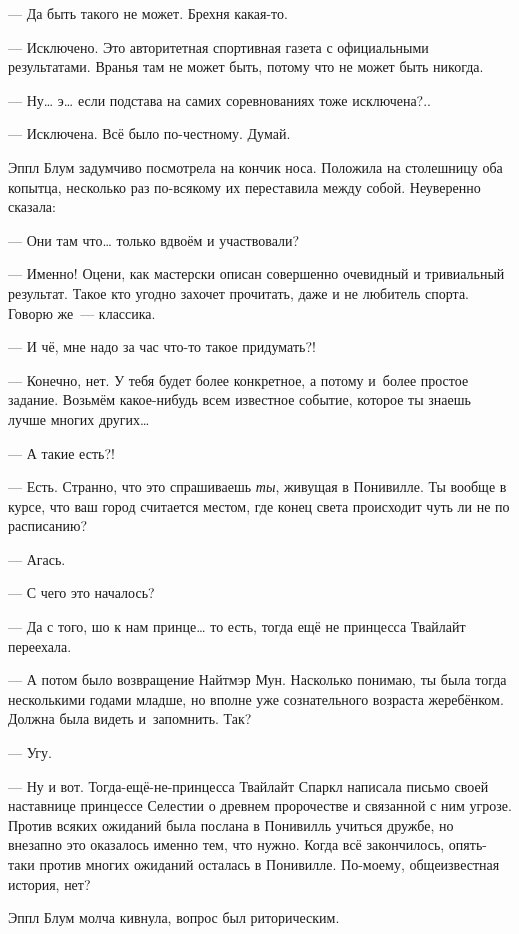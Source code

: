 \documentclass[fontsize=11pt,a5paper,titlepage=firstcover]{scrbook}
\begin{document}
--- Да быть такого не может. Брехня какая-то.

--- Исключено. Это авторитетная спортивная газета с официальными результатами. Вранья там не может быть, потому что не может быть никогда.

--- Ну{\ldots} э{\ldots} если подстава на самих соревнованиях тоже исключена?..

--- Исключена. Всё было по-честному. Думай.

Эппл Блум задумчиво посмотрела на кончик носа. Положила на столешницу оба копытца, несколько раз по-всякому их переставила между собой. Неуверенно сказала:

--- Они там что{\ldots} только вдвоём и участвовали?

--- Именно! Оцени, как мастерски описан совершенно очевидный и тривиальный результат. Такое кто угодно захочет прочитать, даже и не любитель спорта. Говорю же~--- классика.

--- И чё, мне надо за час что-то такое придумать?!

--- Конечно, нет. У тебя будет более конкретное, а потому и~более простое задание. Возьмём какое-нибудь всем известное событие, которое ты знаешь лучше многих других{\ldots}

--- А такие есть?!

--- Есть. Странно, что это спрашиваешь \emph{ты}, живущая в Понивилле. Ты вообще в курсе, что ваш город считается местом, где конец света происходит чуть ли не по расписанию?

--- Агась.

--- С чего это началось?

--- Да с того, шо к нам принце{\ldots} то есть, тогда ещё не принцесса Твайлайт переехала.

--- А потом было возвращение Найтмэр Мун. Насколько понимаю, ты была тогда несколькими годами младше, но вполне уже сознательного возраста жеребёнком. Должна была видеть и~запомнить. Так?

--- Угу.

--- Ну и вот. Тогда-ещё-не-принцесса Твайлайт Спаркл написала письмо своей наставнице принцессе Селестии о древнем пророчестве и связанной с ним угрозе. Против всяких ожиданий была послана в Понивилль учиться дружбе, но внезапно это оказалось именно тем, что нужно. Когда всё закончилось, опять-таки против многих ожиданий осталась в Понивилле. По-моему, общеизвестная история, нет?

Эппл Блум молча кивнула, вопрос был риторическим.
\end{document}
